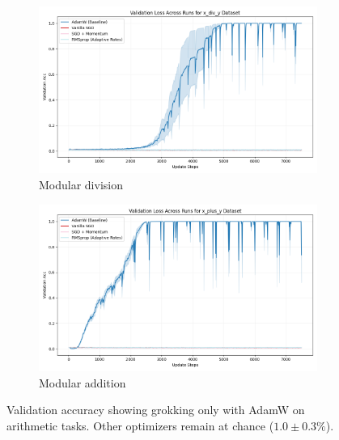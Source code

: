 \documentclass{article} %
\begin{document}
\begin{figure}[t]
    \centering
    \begin{subfigure}{0.48\textwidth}
        \includegraphics[width=\textwidth]{val_acc_x_div_y.png}
        \caption{Modular division}
        \label{fig:div_acc}
    \end{subfigure}
    \hfill
    \begin{subfigure}{0.48\textwidth}
        \includegraphics[width=\textwidth]{val_acc_x_plus_y.png}
        \caption{Modular addition}
        \label{fig:add_acc}
    \end{subfigure}
    \caption{Validation accuracy showing grokking only with AdamW on arithmetic tasks. Other optimizers remain at chance ($1.0\pm0.3\%$).}
    \label{fig:grokking}
\end{figure}
\end{document}
